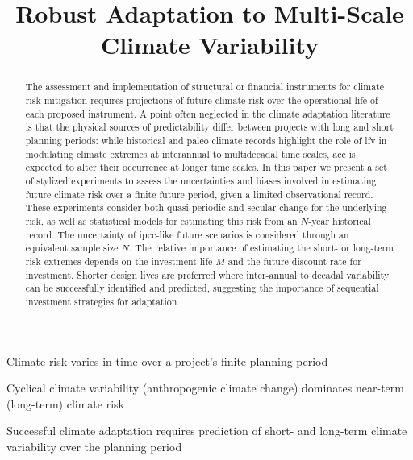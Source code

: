 \documentclass[
]{agujournal2018}
\begin{document}
\title{Robust Adaptation to Multi-Scale Climate Variability}

\begin{keypoints}
  \item Climate risk varies in time over a project's finite planning period
  \item Cyclical climate variability (anthropogenic climate change) dominates near-term (long-term) climate risk
  \item Successful climate adaptation requires prediction of short- and long-term climate variability over the planning period
\end{keypoints}

\begin{abstract}
  The assessment and implementation of structural or financial instruments for climate risk mitigation requires projections of future climate risk over the operational life of each proposed instrument.
  A point often neglected in the climate adaptation literature is that the physical sources of predictability differ between projects with long and short planning periods: while historical and paleo climate records highlight the role of \acrlong{lfv} in modulating climate extremes at interannual to multidecadal time scales, \acrlong{acc} is expected to alter their occurrence at longer time scales.
  In this paper we present a set of stylized experiments to assess the uncertainties and biases involved in estimating future climate risk over a finite future period, given a limited observational record.
  These experiments consider both quasi-periodic and secular change for the underlying risk, as well as statistical models for estimating this risk from an $N$-year historical record.
  The uncertainty of \acrshort{ipcc}-like future scenarios is considered through an equivalent sample size $N$. 
  The relative importance of estimating the short- or long-term risk extremes depends on the investment life $M$ and the future discount rate for investment.
  Shorter design lives are preferred where inter-annual to decadal variability can be successfully identified and predicted, suggesting the importance of sequential investment strategies for adaptation. 
\end{abstract}
\end{document}
